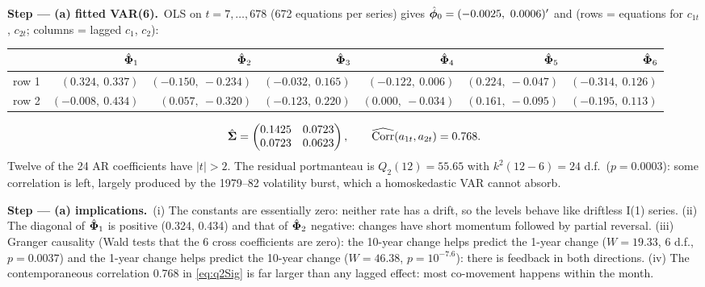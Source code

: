 \documentclass[11pt,a4paper]{article}
\newcommand{\passo}[2]{\par\smallskip\noindent\textbf{Step --- #1.}~#2}
\begin{document}
\begin{sol}
\passo{(a) fitted VAR(6)}{OLS on $t=7,\dots,678$ (672 equations per series) gives
$\hat{\bm{\phi}}_0=(-0.0025,\ 0.0006)'$ and (rows = equations for $c_{1t}$, $c_{2t}$; columns = lagged $c_1$, $c_2$):}
\begin{center}\scriptsize\setlength{\tabcolsep}{3pt}
\begin{tabular}{lrrrrrr}
\toprule
 & $\hat{\bm{\Phi}}_1$ & $\hat{\bm{\Phi}}_2$ & $\hat{\bm{\Phi}}_3$ & $\hat{\bm{\Phi}}_4$ & $\hat{\bm{\Phi}}_5$ & $\hat{\bm{\Phi}}_6$\\
\midrule
row 1 & $(0.324,\ 0.337)$ & $(-0.150,\ -0.234)$ & $(-0.032,\ 0.165)$ & $(-0.122,\ 0.006)$ & $(0.224,\ -0.047)$ & $(-0.314,\ 0.126)$\\
row 2 & $(-0.008,\ 0.434)$ & $(0.057,\ -0.320)$ & $(-0.123,\ 0.220)$ & $(0.000,\ -0.034)$ & $(0.161,\ -0.095)$ & $(-0.195,\ 0.113)$\\
\bottomrule
\end{tabular}
\end{center}
\begin{equation}
\hat{\bm{\Sigma}}=\begin{pmatrix}0.1425&0.0723\\0.0723&0.0623\end{pmatrix},\qquad
\widehat{\mathrm{Corr}}(a_{1t},a_{2t})=0.768.\label{eq:q2Sig}
\end{equation}
Twelve of the 24 AR coefficients have $|t|>2$. The residual portmanteau is $Q_2(12)=55.65$ with
$k^2(12-6)=24$ d.f.\ ($p=0.0003$): some correlation is left, largely produced by the 1979--82
volatility burst, which a homoskedastic VAR cannot absorb.

\passo{(a) implications}{(i) The constants are essentially zero: neither rate has a drift, so the
levels behave like driftless I(1) series. (ii) The diagonal of $\hat{\bm{\Phi}}_1$ is positive (0.324,
0.434) and that of $\hat{\bm{\Phi}}_2$ negative: changes have short momentum followed by partial reversal.
(iii) Granger causality (Wald tests that the 6 cross coefficients are zero): the 10-year change
helps predict the 1-year change ($W=19.33$, 6 d.f., $p=0.0037$) and the 1-year change helps predict
the 10-year change ($W=46.38$, $p=10^{-7.6}$): there is feedback in both directions. (iv) The
contemporaneous correlation 0.768 in \eqref{eq:q2Sig} is far larger than any lagged effect: most
co-movement happens within the month.}


\end{sol}
\end{document}
